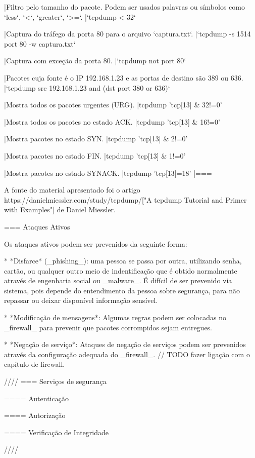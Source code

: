 |Filtro pelo tamanho do pacote. Podem ser usados palavras ou símbolos como `less`, `<`, `greater`, `>=`.
|`tcpdump < 32`

|Captura do tráfego da porta 80 para o arquivo `captura.txt`.
|`tcpdump -s 1514 port 80 -w captura.txt`

|Captura com exceção da porta 80.
|`tcpdump not port 80`

|Pacotes cuja fonte é o IP 192.168.1.23 e as portas de destino são 389 ou 636.
|`tcpdump src 192.168.1.23 and (dst port 380 or 636)`

|Mostra  todos os pacotes urgentes (URG).
|tcpdump 'tcp[13] & 32!=0'

|Mostra  todos os pacotes no estado ACK.
|tcpdump 'tcp[13] & 16!=0'

|Mostra pacotes no estado SYN.
|tcpdump 'tcp[13] & 2!=0'

|Mostra pacotes no estado FIN.
|tcpdump 'tcp[13] & 1!=0'

|Mostra pacotes no estado SYNACK.
|tcpdump 'tcp[13]=18'
|===

A fonte do material apresentado foi o artigo
https://danielmiessler.com/study/tcpdump/["A tcpdump Tutorial and
Primer with Examples"] de Daniel Miessler.

=== Ataques Ativos

Os ataques ativos podem ser prevenidos da seguinte forma:

* *Disfarce* (_phishing_): uma pessoa se passa por outra, utilizando
senha, cartão, ou qualquer outro meio de indentificação que é obtido
normalmente através de engenharia social ou _malware_. É difícil de
ser prevenido via sistema, pois depende do entendimento da pessoa
sobre segurança, para não repassar ou deixar disponível informação
sensível.

* *Modificação de mensagens*: Algumas regras podem ser colocadas no
_firewall_ para prevenir que pacotes corrompidos sejam entregues.

* *Negação de serviço*: Ataques de negação de serviços podem ser
prevenidos através da configuração adequada do _firewall_.
// TODO fazer ligação com o capítulo de firewall.

////
=== Serviços de segurança

==== Autenticação

==== Autorização

==== Verificação de Integridade

////
